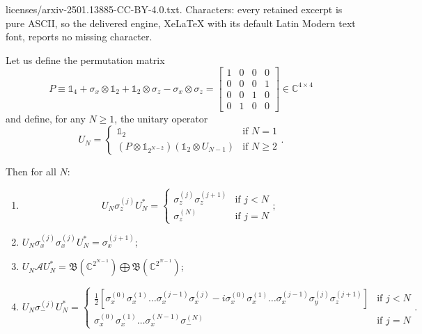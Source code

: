 \documentclass[10pt,a4paper]{amsart}
\newcommand{\As}{\mathscr{A}}
\newcommand{\Bf}{\mathfrak{B}}
\newcommand{\Cb}{\mathbb{C}}
\newcommand{\one}{\mathbb{1}}
\begin{document}
licenses/arxiv-2501.13885-CC-BY-4.0.txt. Characters: every retained excerpt is pure ASCII, so the delivered engine, XeLaTeX with its default Latin Modern text font, reports no missing character.
\begin{lemma}
    Let us define the permutation matrix \[P \equiv \one_4 + \sigma_x\otimes\one_2 + \one_2\otimes\sigma_z  -\sigma_x\otimes\sigma_z = \begin{bmatrix}
        1&0&0&0\\0&0&0&1\\0&0&1&0\\0&1&0&0
    \end{bmatrix} \in\Cb^{4\times4}\] and define, for any $N\geq1$, the unitary operator \[U_N = \begin{cases}
        \one_2 & \text{if }N=1\\
        (P\otimes\one_{2^{N-2}})(\one_2\otimes U_{N-1}) &\text{if } N\geq2
    \end{cases}.\]

    Then for all $N$: 
    \begin{enumerate}
        \item \[U_N \sigma_z^{(j)} U_N^* = \begin{cases}
            \sigma_z^{(j)}\sigma_z^{(j+1)}&\text{if }j<N\\
            \sigma_z^{(N)}&\text{if }j=N
        \end{cases};\]
        \item \(U_N \sigma_x^{(j)}\sigma_x^{(j)} U_N^* = \sigma_x^{(j+1)}\);
        \item $U_N \As U_N^* = \Bf(\Cb^{2^{N-1}}) \bigoplus \Bf(\Cb^{2^{N-1}})$;
        \item 
        \[U_N \sigma_-^{(j)} U_N^* =\begin{cases}
            \frac{1}{2}\left[\sigma_x^{(0)}\sigma_x^{(1)}\dots\sigma_x^{(j-1)}\sigma_x^{(j)} -i \sigma_x^{(0)}\sigma_x^{(1)}\dots\sigma_x^{(j-1)}\sigma_y^{(j)} \sigma_z^{(j+1)} \right]&\text{if }j < N\\
            \sigma_x^{(0)}\sigma_x^{(1)}\dots\sigma_x^{(N-1)}\sigma_-^{(N)}&\text{if }j=N
        \end{cases}. \]
    \end{enumerate}
\end{lemma}
\end{document}
